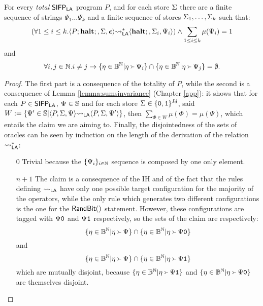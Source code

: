 \begin{lemma}
  \label{lemma:sifplaquantsem}
  For every \emph{total} $\mathsf{SIFP_{{\mathsf{LA}}}}$ program $P$, and for each store $\Sigma$
  there are a finite sequence of strings $\Psi_1 \ldots \Psi_k$
  and a finite sequence of stores $\Sigma_1, \ldots, \Sigma_k$ such that:
  $$
    \left(\forall 1\le i \le k.\langle P;\mathbf{halt};, \Sigma, \bm{\epsilon}\rangle {\leadsto_{\mathsf{LA}}^{*}} \langle \mathbf{halt};, \Sigma_i,\Psi_i\rangle \right)\land\sum_{1 \le i\le k} \mu(\Psi_i)=1
  $$
  and
  $$
  \forall i, j \in \mathbb{N}. i\neq j \to \{\eta \in \mathbb{B}^{\mathbb{N}} | \eta \Yright \Psi_i\}\cap\{\eta \in \mathbb{B}^{\mathbb{N}} | \eta \Yright \Psi_j\}=\emptyset.
  $$
\end{lemma}
\begin{proof}
  The first part is a consequence of the totality of $P$, while the second
  is a consequence of Lemma \ref{lemma:sumsinvariance} (Chapter \ref{app}):
  it shows that for each $P \in\mathsf{SIFP_{{\mathsf{LA}}}}$, $\Psi \in \mathbb{S}$ and for each
  store $\Sigma \in \{\mathtt{0}, \mathtt{1}\}^{\mathit{Id}}$, said  $W:=\{\Psi'\in \mathbb{S}| \langle P, \Sigma, \Psi\rangle {\leadsto_{\mathsf{LA}}} \langle P, \Sigma, \Psi'\rangle\}$,
  then $\sum_{\Phi \in W} \mu(\Phi)=\mu(\Psi)$,
  which entails the claim we are aiming to.
  Finally, the disjointedness of the sets of oracles can be seen
  by induction on the length of the derivation of the relation ${\leadsto_{\mathsf{LA}}^{*}}$:
  \begin{itemize}
    \item[$0$] Trivial because the $\{\Psi_i\}_{i\in \mathbb{N}}$ sequence is composed by one only element.
    \item[$n+1$] The claim is a consequence of the IH and of
    the fact that the rules defining
    ${\leadsto_{\mathsf{LA}}}$ have only one possible target configuration for the majority
    of the operators, while the only rule which generates two different
    configurations is the one for the $\mathsf{RandBit()}$ statement. However,
    these configurations are tagged with $\Psi\mathtt{0}$ and $\Psi\mathtt{1}$ respectively,
    so the sets of the claim are respectively:
    $$
      \{\eta \in \mathbb{B}^{\mathbb{N}} | \eta \Yright \Psi\} \cap \{\eta \in \mathbb{B}^{\mathbb{N}} | \eta \Yright \Psi\mathtt{0}\}
    $$
    and
    $$
      \{\eta \in \mathbb{B}^{\mathbb{N}} | \eta \Yright \Psi\} \cap \{\eta \in \mathbb{B}^{\mathbb{N}} | \eta \Yright \Psi\mathtt{1}\}
    $$
    which are mutually disjoint, because $\{\eta \in \mathbb{B}^{\mathbb{N}} | \eta \Yright \Psi\mathtt{1}\}$
    and $\{\eta \in \mathbb{B}^{\mathbb{N}} | \eta \Yright \Psi\mathtt{0}\}$ are themselves
    disjoint.
  \end{itemize}
\end{proof}


